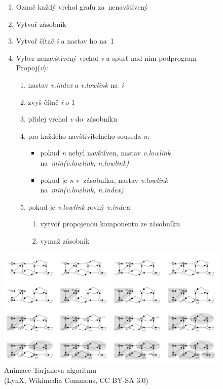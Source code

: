 \begin{figure}[ht]
\onehalfspacing
\begin{enumerate}
\item Označ každý vrchol grafu za~nenavštívený
\item Vytvoř zásobník
\item Vytvoř čítač \emph{i} a nastav ho na~1
\item Vyber nenavštívený vrchol \emph{v} a spusť nad ním podprogram Propoj(\emph{v}):
    \begin{enumerate}
    \item nastav \emph{v.index} a \emph{v.lowlink} na~\emph{i}
    \item zvyš čítač \emph{i} o 1
    \item přidej vrchol \emph{v} do~zásobníku
    \item pro každého navštívitelného souseda \emph{n}:
        \begin{itemize}
        \item pokud \emph{n} nebyl navštíven, nastav \emph{v.lowlink} na~\emph{min(v.lowlink, n.lowlink)}
        \item pokud je \emph{n} v~zásobníku, nastav \emph{v.lowlink} na~\emph{min(v.lowlink, n.index)}
        \end{itemize}
    \item pokud je \emph{v.lowlink} rovný \emph{v.index}:
        \begin{enumerate}
        \item vytvoř propojenou komponentu ze zásobníku
        \item vymaž zásobník
        \end{enumerate}
    \end{enumerate}
\end{enumerate}
\end{figure}
\FloatBarrier

\begin{figure}[ht]
\centering
\includegraphics[width=\textwidth]{images/3_tarjanuv-algoritmus-animace.png}

\caption[Animace Tarjanova algoritmu]{Animace Tarjanova algoritmu\\{\small (LynX, Wikimedia Commons, CC BY-SA 3.0)}}
\end{figure}

